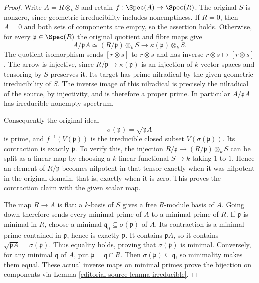 \begin{proof}
Write $A=R\otimes_k S$ and retain
$f:\Spec(A)\to\Spec(R)$. The
original $S$ is nonzero, since
geometric irreducibility includes
nonemptiness. If $R=0$, then
$A=0$ and both sets of components
are empty, so the assertion
holds. Otherwise, for every
$\mathfrak p\in\Spec(R)$ the
original quotient and fibre maps
give
$$
A/\mathfrak pA\simeq(R/\mathfrak p)\otimes_k S
\longrightarrow\kappa(\mathfrak p)\otimes_k S.
$$
The quotient isomorphism sends
$[r\otimes s]$ to $\overline r\otimes s$
and has inverse
$\overline r\otimes s\mapsto[r\otimes s]$.
The arrow is injective, since
$R/\mathfrak p\to\kappa(\mathfrak p)$
is an injection of $k$-vector
spaces and tensoring by $S$
preserves it. Its target has
prime nilradical by the given
geometric irreducibility of $S$.
The inverse image of this
nilradical is precisely the
nilradical of the source, by
injectivity, and is therefore
a proper prime. In particular
$A/\mathfrak pA$ has irreducible
nonempty spectrum.

Consequently the original ideal
$$
\sigma(\mathfrak p)=\sqrt{\mathfrak pA}
$$
is prime, and $f^{-1}(V(\mathfrak p))$
is the irreducible closed subset
$V(\sigma(\mathfrak p))$.
Its contraction is exactly
$\mathfrak p$. To verify this,
the injection
$R/\mathfrak p\to(R/\mathfrak p)\otimes_k S$
can be split as a linear map
by choosing a $k$-linear
functional $S\to k$ taking
$1$ to $1$. Hence an element
of $R/\mathfrak p$ becomes
nilpotent in that tensor
exactly when it was nilpotent
in the original domain, that
is, exactly when it is zero.
This proves the contraction
claim with the given scalar
map.

The map $R\to A$ is flat: a
$k$-basis of $S$ gives a free
$R$-module basis of $A$.
Going down therefore sends
every minimal prime of $A$
to a minimal prime of $R$.
If $\mathfrak p$ is minimal
in $R$, choose a minimal
$\mathfrak q_0\subseteq\sigma(\mathfrak p)$
of $A$. Its contraction is
a minimal prime contained
in $\mathfrak p$, hence is
exactly $\mathfrak p$.
It contains $\mathfrak pA$,
so it contains
$\sqrt{\mathfrak pA}=\sigma(\mathfrak p)$.
Thus equality holds, proving
that $\sigma(\mathfrak p)$
is minimal. Conversely, for
any minimal $\mathfrak q$
of $A$, put
$\mathfrak p=\mathfrak q\cap R$.
Then $\sigma(\mathfrak p)\subseteq\mathfrak q$,
so minimality makes them equal.
These actual inverse maps on
minimal primes prove the
bijection on components via
Lemma \ref{editorial-source-lemma-irreducible}.


\end{proof}
